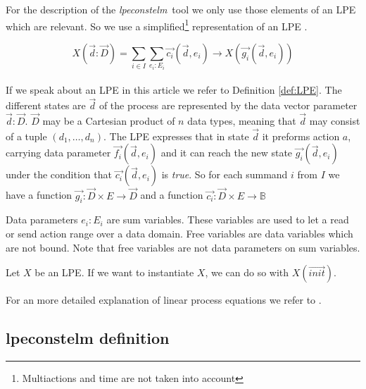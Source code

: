 \documentclass[a4paper,10pt]{article}
\theoremstyle{plain}
\theoremstyle{definition}
\newcommand{\lpe}{linear process equation}
\newcommand{\tool}{\textit{lpeconstelm}}
\newcommand{\ovr}{\overrightarrow}
\newcommand{\ti}{\textit}
\begin{document}
For the description of the \tool\ tool we only use those elements of an LPE which are relevant. So we use a simplified\footnote{Multiactions and time are not taken into account} representation of an LPE .
\begin{defn}\label{def:LPE}
\begin{displaymath}
X (\ovr{d}:\ovr{D}) = \sum_{i \in I} \sum_{e_i:E_i} \ovr{c_i} ( \ovr{d}, e_i ) \rightarrow X(\ovr{g_i}(\ovr{d},e_i))
\end{displaymath}\\
If we speak about an LPE in this article we refer to Definition \ref{def:LPE}.  The different states are $\ovr{d}$ of the process are represented by the data vector parameter $\ovr{d}:\ovr{D}$. $\ovr{D}$ may be a Cartesian product of $n$ data types, meaning that $\ovr{d}$ may consist of a tuple $(d_1, \ldots, d_n)$. The LPE expresses that in state $\ovr{d}$ it preforms action $a$, carrying data parameter $\ovr{f_i}(\ovr{d},e_i)$ and it can reach the new state $\ovr{g_i}(\ovr{d},e_i)$ under the condition that $\ovr{c_i}(\ovr{d},e_i)$ is \ti{true}. So for each summand $i$ from $I$ we have a function $\ovr{g_i}: \ovr{D} \times E \rightarrow \ovr{D}$ and a function $\ovr{c_i}: \ovr{D} \times E \rightarrow \mathbb{B}$


Data parameters $e_i : E_i$ are sum variables. These variables are used to let a read or send action range over a data domain. Free variables are data variables which are not bound. Note that free variables are not data parameters on sum variables.

Let $X$ be an LPE. If we want to instantiate $X$, we can do so with $X(\ovr{init})$. 

For an more detailed explanation of \lpe s  we refer to \cite{LPE_info}.
\end{defn}

\subsection{lpeconstelm definition}\label{subsec:lpedef}
\end{document}
